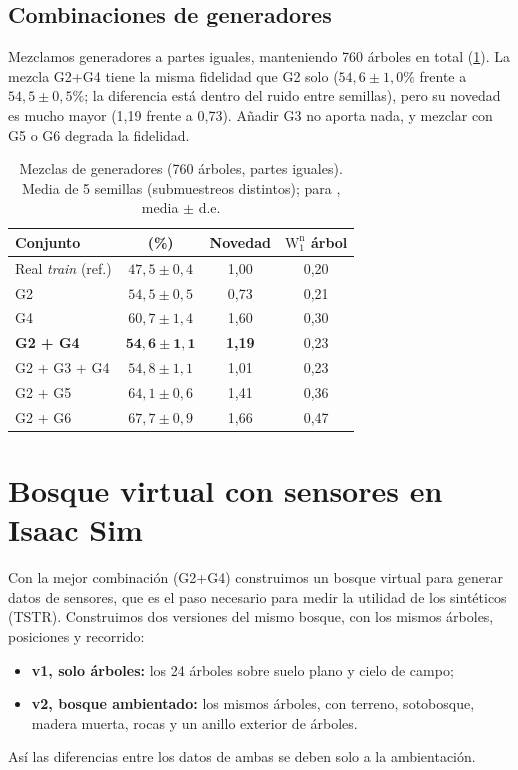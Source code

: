 \documentclass[11pt,a4paper]{article}
\newcommand{\Wn}{\mathrm{W}_1^{\mathrm{n}}}
\newcommand{\NNA}{\text{1-NNA}}
\begin{document}
\subsection{Combinaciones de generadores}
Mezclamos generadores a partes iguales, manteniendo 760 árboles en total (\cref{tab:mix}). La mezcla G2+G4 tiene la misma fidelidad que G2 solo ($54{,}6 \pm 1{,}0\%$ frente a $54{,}5 \pm 0{,}5\%$; la diferencia está dentro del ruido entre semillas), pero su novedad es mucho mayor (1,19 frente a 0,73). Añadir G3 no aporta nada, y mezclar con G5 o G6 degrada la fidelidad.

\begin{table}[t]
\centering
\caption{Mezclas de generadores (760 árboles, partes iguales). Media de 5 semillas (submuestreos distintos); para \NNA, media $\pm$ d.e.}
\label{tab:mix}
\begin{tabular}{lccc}
\toprule
Conjunto & \NNA{} (\%) & Novedad & $\Wn$ árbol \\
\midrule
Real \emph{train} (ref.) & $47{,}5 \pm 0{,}4$ & 1,00 & 0,20 \\
G2 & $54{,}5 \pm 0{,}5$ & 0,73 & 0,21 \\
G4 & $60{,}7 \pm 1{,}4$ & 1,60 & 0,30 \\
\textbf{G2 + G4} & $\mathbf{54{,}6 \pm 1{,}1}$ & \textbf{1,19} & 0,23 \\
G2 + G3 + G4 & $54{,}8 \pm 1{,}1$ & 1,01 & 0,23 \\
G2 + G5 & $64{,}1 \pm 0{,}6$ & 1,41 & 0,36 \\
G2 + G6 & $67{,}7 \pm 0{,}9$ & 1,66 & 0,47 \\
\bottomrule
\end{tabular}
\end{table}

\section{Bosque virtual con sensores en Isaac Sim}

Con la mejor combinación (G2+G4) construimos un bosque virtual para generar datos de sensores, que es el paso necesario para medir la utilidad de los sintéticos (TSTR). Construimos dos versiones del mismo bosque, con los mismos árboles, posiciones y recorrido:
\begin{itemize}
  \item \textbf{v1, solo árboles:} los 24 árboles sobre suelo plano y cielo de campo;
  \item \textbf{v2, bosque ambientado:} los mismos árboles, con terreno, sotobosque, madera muerta, rocas y un anillo exterior de árboles.
\end{itemize}
Así las diferencias entre los datos de ambas se deben solo a la ambientación.
\end{document}
